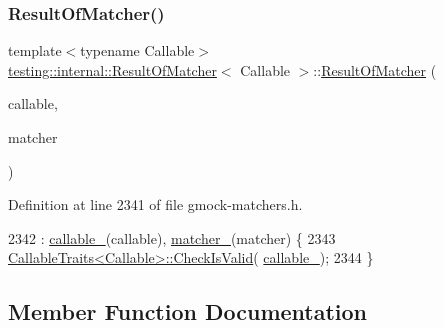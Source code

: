 \subsubsection{\texorpdfstring{Result\+Of\+Matcher()}{ResultOfMatcher()}}
{\footnotesize\ttfamily template$<$typename Callable$>$ \\
\hyperlink{classtesting_1_1internal_1_1ResultOfMatcher}{testing\+::internal\+::\+Result\+Of\+Matcher}$<$ Callable $>$\+::\hyperlink{classtesting_1_1internal_1_1ResultOfMatcher}{Result\+Of\+Matcher} (\begin{DoxyParamCaption}\item[{Callable}]{callable,  }\item[{const \hyperlink{classtesting_1_1Matcher}{Matcher}$<$ \hyperlink{classtesting_1_1internal_1_1ResultOfMatcher_aa9db2267792fcae2cfa3f57683f4e048}{Result\+Type} $>$ \&}]{matcher }\end{DoxyParamCaption})\hspace{0.3cm}{\ttfamily [inline]}}



Definition at line 2341 of file gmock-\/matchers.\+h.


\begin{DoxyCode}
2342       : \hyperlink{classtesting_1_1internal_1_1ResultOfMatcher_a0da13870ff65546571ed39ec798242aa}{callable\_}(callable), \hyperlink{classtesting_1_1internal_1_1ResultOfMatcher_ad74ae1b72a5f2045ea1e557e7c643887}{matcher\_}(matcher) \{
2343     \hyperlink{structtesting_1_1internal_1_1CallableTraits_ab09a6487235947ec9c5d933d07ac605b}{CallableTraits<Callable>::CheckIsValid}(
      \hyperlink{classtesting_1_1internal_1_1ResultOfMatcher_a0da13870ff65546571ed39ec798242aa}{callable\_});
2344   \}
\end{DoxyCode}


\subsection{Member Function Documentation}
\mbox{\label{classtesting_1_1internal_1_1ResultOfMatcher_aad5df085fb0d9648eb8eaaf9b53b14e8}} 
